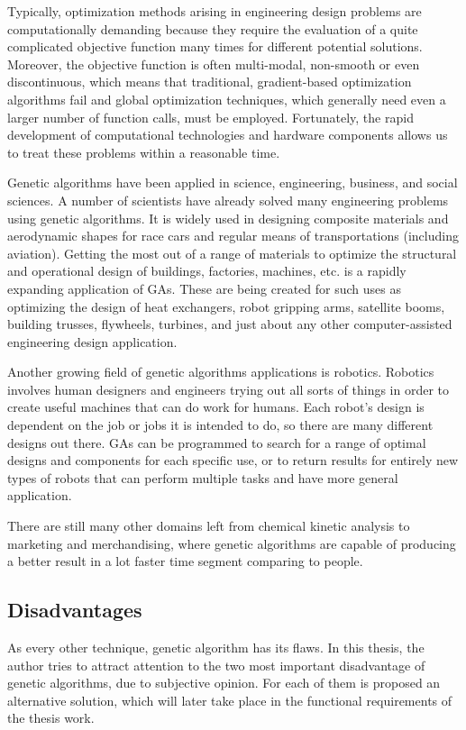 Typically, optimization methods arising in engineering design problems are computationally demanding because they require the evaluation of a quite complicated objective function many times for different potential solutions. Moreover, the objective function is often multi-modal, non-smooth or even discontinuous, which means that traditional, gradient-based optimization algorithms fail and global optimization techniques, which generally need even a larger number of function calls, must be employed. Fortunately, the rapid development of computational technologies and hardware components allows us to treat these problems within a reasonable time.

Genetic algorithms have been applied in science, engineering, business, and social sciences. A number of scientists have already solved many engineering problems using genetic algorithms. It is widely used in designing composite materials and aerodynamic shapes for race cars and regular means of transportations (including aviation). Getting the most out of a range of materials to optimize the structural and operational design of buildings, factories, machines, etc. is a rapidly expanding application of GAs. These are being created for such uses as optimizing the design of heat exchangers, robot gripping arms, satellite booms, building trusses, flywheels, turbines, and just about any other computer-assisted engineering design application. 

Another growing field of genetic algorithms applications is robotics. Robotics involves human designers and engineers trying out all sorts of things in order to create useful machines that can do work for humans. Each robot’s design is dependent on the job or jobs it is intended to do, so there are many different designs out there. GAs can be programmed to search for a range of optimal designs and components for each specific use, or to return results for entirely new types of robots that can perform multiple tasks and have more general application.

There are still many other domains left from chemical kinetic analysis to marketing and merchandising, where genetic algorithms are capable of producing a better result in a lot faster time segment comparing to people.

\subsection{Disadvantages}
As every other technique, genetic algorithm has its flaws. In this thesis, the author tries to attract attention to the two most important disadvantage of genetic algorithms, due to subjective opinion. For each of them is proposed an alternative solution, which will later take place in the functional requirements of the thesis work.

